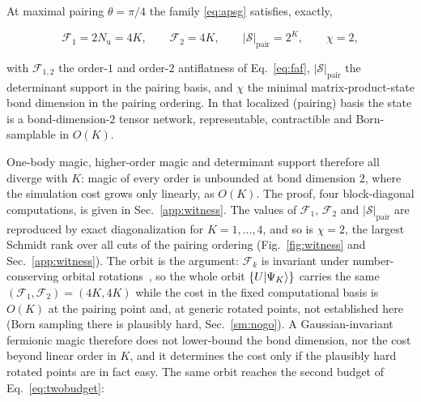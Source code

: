 \begin{theorem}\label{thm:witness}
At maximal pairing $\theta=\pi/4$ the family \eqref{eq:apsg} satisfies, exactly,
\begin{widetext}
\begin{equation}
\mathcal F_1=2N_{\mathrm u}=4K,\qquad \mathcal F_2=4K,\qquad
|\mathcal S|_{\mathrm{pair}}=2^{K},\qquad \chi=2,
\end{equation}
\end{widetext}
with $\mathcal F_{1,2}$ the order-$1$ and order-$2$ antiflatness of Eq.~\eqref{eq:faf},
$|\mathcal S|_{\mathrm{pair}}$ the determinant support in the pairing basis, and $\chi$ the minimal
matrix-product-state bond dimension in the pairing ordering. In that localized (pairing) basis the state
is a bond-dimension-$2$ tensor network, representable, contractible and Born-samplable in $O(K)$.
\end{theorem}

\noindent One-body magic, higher-order magic and determinant support therefore all diverge with $K$:
magic of every order is unbounded at bond dimension $2$, where the simulation cost grows only linearly, as $O(K)$. The
proof, four block-diagonal computations, is given in
Sec.~\ref{app:witness}. The values of $\mathcal F_1$, $\mathcal F_2$ and
$|\mathcal S|_{\mathrm{pair}}$ are reproduced by exact diagonalization for $K=1,\dots,4$, and so is
$\chi=2$, the largest Schmidt rank over all cuts of the pairing ordering (Fig.~\ref{fig:witness} and
Sec.~\ref{app:witness}). The orbit is the
argument: $\mathcal F_k$ is invariant under number-conserving orbital rotations~\cite{sierant2026}, so
the whole orbit $\{U\lvert \Psi_K \rangle\}$ carries the same $(\mathcal F_1,\mathcal F_2)=(4K,4K)$ while the
cost in the fixed computational basis is $O(K)$ at the pairing point and, at generic rotated points, not
established here (Born sampling there is plausibly hard, Sec.~\ref{sm:nogo}). A Gaussian-invariant fermionic
magic therefore does not lower-bound the bond dimension, nor the cost beyond linear order in $K$, and it determines the cost only if the plausibly hard
rotated points are in fact easy. The same orbit reaches the second
budget of Eq.~\eqref{eq:twobudget}:

